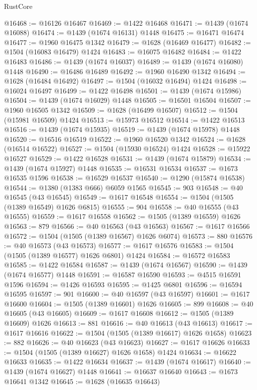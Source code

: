 \begin{lexlean}{RustCore}
\begin{coremodule}
@16468 := @16126 @16467
@16469 := @1422 @16468
@16471 := @1439 (@1674 @16088)
@16474 := @1439 (@1674 @16131) @1448
@16475 := @16471 @16474
@16477 := @1960 @16475 @1342
@16479 := @1628 (@16469 @16477)
@16482 := @1504 (@16083 @16479) @1424
@16483 := @16075 @16482
@16484 := @1422 @16483
@16486 := @1439 (@1674 @16037)
@16489 := @1439 (@1674 @16080) @1448
@16490 := @16486 @16489
@16492 := @1960 @16490 @1342
@16494 := @1628 (@16484 @16492)
@16497 := @1504 (@16032 @16494) @1424
@16498 := @16024 @16497
@16499 := @1422 @16498
@16501 := @1439 (@1674 @15986)
@16504 := @1439 (@1674 @16029) @1448
@16505 := @16501 @16504
@16507 := @1960 @16505 @1342
@16509 := @1628 (@16499 @16507)
@16512 := @1504 (@15981 @16509) @1424
@16513 := @15973 @16512
@16514 := @1422 @16513
@16516 := @1439 (@1674 @15935)
@16519 := @1439 (@1674 @15978) @1448
@16520 := @16516 @16519
@16522 := @1960 @16520 @1342
@16524 := @1628 (@16514 @16522)
@16527 := @1504 (@15930 @16524) @1424
@16528 := @15922 @16527
@16529 := @1422 @16528
@16531 := @1439 (@1674 @15879)
@16534 := @1439 (@1674 @15927) @1448
@16535 := @16531 @16534
@16537 := @1673 @16535 @1596
@16538 := @16529 @16537
@16540 := @1290 (@15874 @16538)
@16544 := @1380 (@1383 @666) @6059 @1565
@16545 := 903
@16548 := @40 @16545 (@43 @16545)
@16549 := @1617 @16548
@16554 := @1504 (@1505 (@1389 @16549) @1626 @6815)
@16555 := 904
@16558 := @40 @16555 (@43 @16555)
@16559 := @1617 @16558
@16562 := @1505 (@1389 @16559) @1626
@16563 := 879
@16566 := @40 @16563 (@43 @16563)
@16567 := @1617 @16566
@16572 := @1504 (@1505 (@1389 @16567) @1626 @6074)
@16573 := 880
@16576 := @40 @16573 (@43 @16573)
@16577 := @1617 @16576
@16583 := @1504 (@1505 (@1389 @16577) @1626 @6801) @1424
@16584 := @16572 @16583
@16585 := @1422 @16584
@16587 := @1439 (@1674 @16567)
@16590 := @1439 (@1674 @16577) @1448
@16591 := @16587 @16590
@16593 := @4515 @16591 @1596
@16594 := @1426 @16593
@16595 := @1425 @6801
@16596 := @16594 @16595
@16597 := 901
@16600 := @40 @16597 (@43 @16597)
@16601 := @1617 @16600
@16604 := @1505 (@1389 @16601) @1626
@16605 := 899
@16608 := @40 @16605 (@43 @16605)
@16609 := @1617 @16608
@16612 := @1505 (@1389 @16609) @1626
@16613 := 881
@16616 := @40 @16613 (@43 @16613)
@16617 := @1617 @16616
@16622 := @1504 (@1505 (@1389 @16617) @1626 @1658)
@16623 := 882
@16626 := @40 @16623 (@43 @16623)
@16627 := @1617 @16626
@16633 := @1504 (@1505 (@1389 @16627) @1626 @1658) @1424
@16634 := @16622 @16633
@16635 := @1422 @16634
@16637 := @1439 (@1674 @16617)
@16640 := @1439 (@1674 @16627) @1448
@16641 := @16637 @16640
@16643 := @1673 @16641 @1342
@16645 := @1628 (@16635 @16643)

\end{coremodule}
\end{lexlean}
